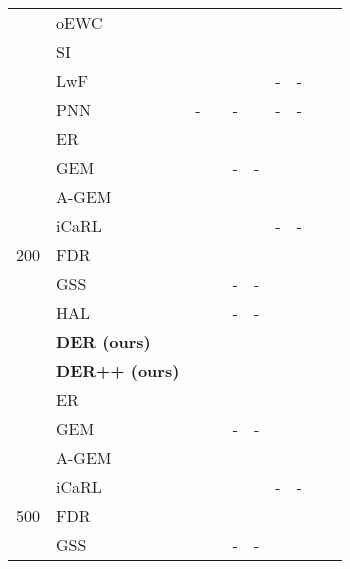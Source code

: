 \documentclass{article}
\newcommand{\xmark}{\textbf{\textendash}}
\begin{document}
\begin{table*}[t]
{\begin{tabular}{clcccccccc}
     & oEWC~\cite{schwarz2018progress}             & \tiny{} & \tiny{} & \tiny{} & \tiny{} & \tiny{} & \tiny{} \\
\multirow{2}{*}{\xmark} & SI~\cite{zenke2017continual}               & \tiny{} & \tiny{} & \tiny{} & \tiny{} & \tiny{} & \tiny{} \\
    & LwF~\cite{li2017learning}              & \tiny{} & \tiny{} & \tiny{} & \tiny{} & - & - \\
     & PNN~\cite{rusu2016progressive}              & - & \tiny{} & - & \tiny{} & - & - \\
\midrule
    & ER~\cite{riemer2018learning} & \tiny{} & \tiny{} & \tiny{} & \tiny{} & \tiny{} & \tiny{} \\
    & GEM~\cite{lopez2017gradient} & \tiny{} & \tiny{} & - & - & \tiny{} & \tiny{} \\
    & A-GEM~\cite{chaudhry2018efficient} & \tiny{} & \tiny{} & \tiny{} & \tiny{} & \tiny{} & \tiny{} \\
    & iCaRL~\cite{rebuffi2017icarl} & \tiny{} & \tiny{} & \tiny{} & \tiny{} & -     & -     \\
200 & FDR~\cite{benjamin2018measuring}         & \tiny{} & \tiny{} & \tiny{} & \tiny{} & \tiny{} & \tiny{} \\
    & GSS~\cite{aljundi2019gradient}          & \tiny{} & \tiny{} & - & - & \tiny{} & \tiny{} \\
    & HAL~\cite{chaudhry2020using}          & \tiny{} & \tiny{} & - & - & \tiny{} & \tiny{} \\
    & \textbf{DER (ours)} & \tiny{} & \tiny{} & \tiny{} & \tiny{} & \tiny{} & \tiny{} \\
    & \textbf{DER++ (ours)} & \tiny{} & \tiny{} & \tiny{} & \tiny{} & \tiny{} & \tiny{} \\
\midrule
    & ER~\cite{riemer2018learning} & \tiny{} & \tiny{} & \tiny{} & \tiny{} & \tiny{} & \tiny{} \\
    & GEM~\cite{lopez2017gradient} & \tiny{} & \tiny{} & - & - & \tiny{} & \tiny{} \\
    & A-GEM~\cite{chaudhry2018efficient} & \tiny{}  & \tiny{}  & \tiny{} & \tiny{} & \tiny{} & \tiny{} \\
    & iCaRL~\cite{rebuffi2017icarl} & \tiny{} & \tiny{} & \tiny{} & \tiny{} & -     & -     \\
500 & FDR~\cite{benjamin2018measuring}          & \tiny{} & \tiny{} & \tiny{} & \tiny{} & \tiny{} & \tiny{} \\
    & GSS~\cite{aljundi2019gradient}          & \tiny{} & \tiny{} & - & - & \tiny{} & \tiny{} \\

\end{tabular}}
\end{table*}
\end{document}
